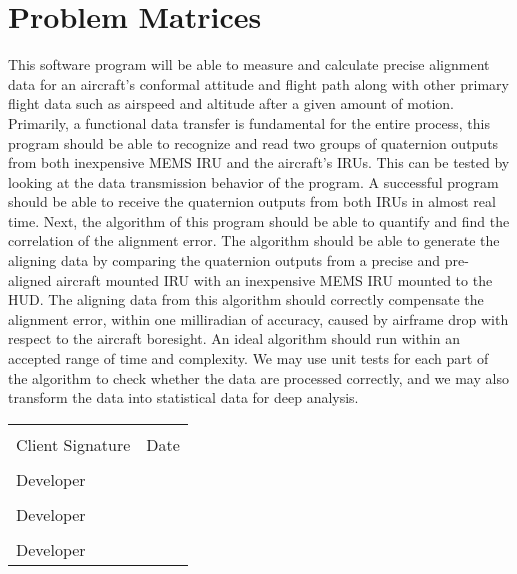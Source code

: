 \documentclass[letterpaper,10pt,titlepage]{article}
\begin{document}
\section*{Problem Matrices}
This software program will be able to measure and calculate precise alignment data for an aircraft’s conformal attitude and flight path along with other primary flight data such as airspeed and altitude after a given amount of motion. Primarily, a functional data transfer is fundamental for the entire process, this program should be able to recognize and read two groups of quaternion outputs from both inexpensive MEMS IRU and the aircraft’s IRUs. This can be tested by looking at the data transmission behavior of the program. A successful program should be able to receive the quaternion outputs from both IRUs in almost real time. Next, the algorithm of this program should be able to quantify and find the correlation of the alignment error. The algorithm should be able to generate the aligning data by comparing the quaternion outputs from a precise and pre-aligned aircraft mounted IRU with an inexpensive MEMS IRU mounted to the HUD.  The aligning data from this algorithm should correctly compensate the alignment error, within one milliradian of accuracy, caused by airframe drop with respect to the aircraft boresight. An ideal algorithm should run within an accepted range of time and complexity. We may use unit tests for each part of the algorithm to check whether the data are processed correctly, and we may also transform the data into statistical data for deep analysis.


\newpage
	\noindent\begin{tabular}{ll}
	\\[2cm]
	\makebox[2.5in]{\hrulefill} & \makebox[2.5in]{\hrulefill}\\
	Client Signature& Date\\[8ex]%
	\makebox[2.5in]{\hrulefill}\\
	Developer\\[8ex]
	\makebox[2.5in]{\hrulefill}\\
	Developer\\[8ex]
	\makebox[2.5in]{\hrulefill}\\
	Developer\\[8ex]
	\end{tabular}
\end{document}
